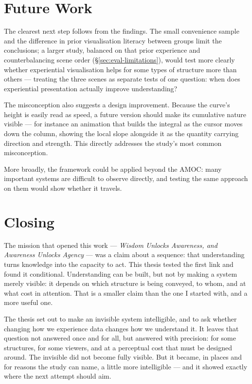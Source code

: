 \section{Future Work}
\label{sec:concl-future}

The clearest next step follows from the findings. The small convenience sample and the difference in prior visualisation literacy between groups limit the conclusions; a larger study, balanced on that prior experience and counterbalancing scene order (\S\ref{sec:eval-limitations}), would test more clearly whether experiential visualisation helps for some types of structure more than others --- treating the three scenes as separate tests of one question: when does experiential presentation actually improve understanding?

The misconception also suggests a design improvement. Because the curve's height is easily read as speed, a future version should make its cumulative nature visible --- for instance an animation that builds the integral as the cursor moves down the column, showing the local slope alongside it as the quantity carrying direction and strength. This directly addresses the study's most common misconception.

More broadly, the framework could be applied beyond the AMOC: many important systems are difficult to observe directly, and testing the same approach on them would show whether it travels.

\section{Closing}
\label{sec:concl-closing}

The mission that opened this work --- \emph{Wisdom Unlocks Awareness, and Awareness Unlocks Agency} --- was a claim about a sequence: that understanding turns knowledge into the capacity to act. This thesis tested the first link and found it conditional. Understanding can be built, but not by making a system merely visible: it depends on which structure is being conveyed, to whom, and at what cost in attention. That is a smaller claim than the one I started with, and a more useful one.

The thesis set out to make an invisible system intelligible, and to ask whether changing how we experience data changes how we understand it. It leaves that question not answered once and for all, but answered with precision: for some structures, for some viewers, and at a perceptual cost that must be designed around. The invisible did not become fully visible. But it became, in places and for reasons the study can name, a little more intelligible --- and it showed exactly where the next attempt should aim.
